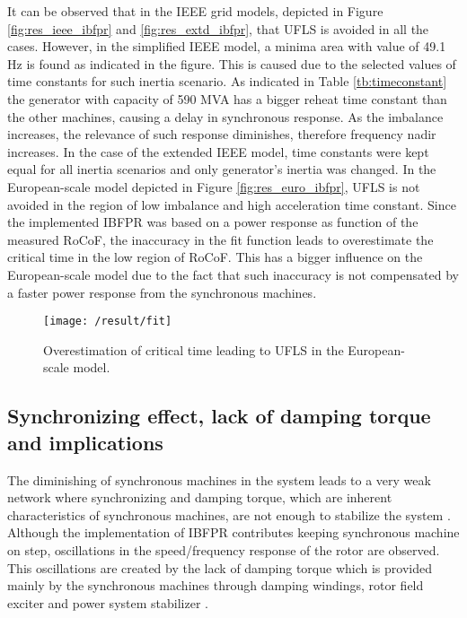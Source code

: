 It can be observed that in the IEEE grid models, depicted in Figure \ref{fig:res_ieee_ibfpr} and \ref{fig:res_extd_ibfpr}, that UFLS is avoided in all the cases. However, in the simplified IEEE model, a minima area with value of 49.1 Hz is found as indicated in the figure. This is caused due to the selected values of time constants for such inertia scenario. As indicated in Table \ref{tb:timeconstant} the generator with capacity of 590 MVA has a bigger reheat time constant than the other machines, causing a delay in synchronous response. As the imbalance increases, the relevance of such response diminishes, therefore frequency nadir increases. In the case of the extended IEEE model, time constants were kept equal for all inertia scenarios and only generator's inertia was changed. In the European-scale model depicted in Figure \ref{fig:res_euro_ibfpr}, UFLS is not avoided in the region of low imbalance and high acceleration time constant. Since the implemented IBFPR was based on a power response as function of the measured RoCoF, the inaccuracy in the fit function leads to overestimate the critical time in the low region of RoCoF. This has a bigger influence on the European-scale model due to the fact that such inaccuracy is not compensated by a faster power response from the synchronous machines.

\begin{figure}[h]
	\centering
	\texttt{[image: /result/fit]}
	\caption{Overestimation of critical time leading to UFLS in the European-scale model.}
	\label{fig:res_fit}
\end{figure}

\subsection{Synchronizing effect, lack of damping torque and implications}

The diminishing of synchronous machines in the system leads to a very weak network where synchronizing and damping torque, which are inherent characteristics of synchronous machines, are not enough to stabilize the system \cite{kundur1994power}. Although the implementation of IBFPR contributes keeping synchronous machine on step, oscillations in the speed/frequency response of the rotor are observed. This oscillations are created by the lack of damping torque which is provided mainly by the synchronous machines through damping windings, rotor field exciter and power system stabilizer \cite{kundur1994power}. 

